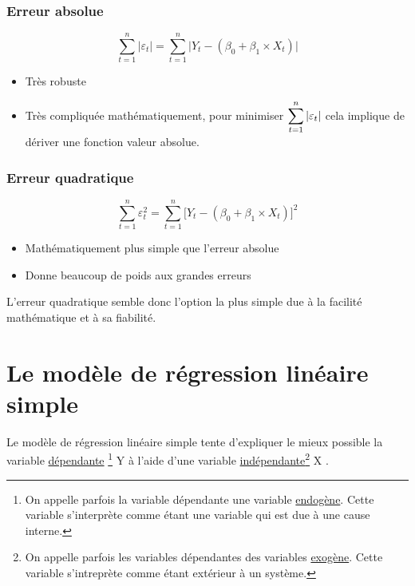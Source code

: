 \documentclass[11pt,french]{report}
\begin{document}
\subsubsection{Erreur absolue}
\begin{equation}
\displaystyle\sum_{t=1}^n |\varepsilon_t| = \displaystyle\sum_{t=1}^n \Big| Y_t - (\beta_0 + \beta_1\times X_t) \Big| 
\end{equation}

\bigskip
\begin{itemize}
\item Très robuste
\item Très compliquée mathématiquement, pour minimiser $\displaystyle\displaystyle\sum_{t=1}^n |\varepsilon_t|$ cela implique de dériver une fonction valeur absolue.
\end{itemize}

\subsubsection{Erreur quadratique}
\begin{equation}
\displaystyle\sum_{t=1}^n \varepsilon_t^2 = \displaystyle\sum_{t=1}^n \Big[ Y_t - (\beta_0 + \beta_1\times X_t) \Big]^2 
\end{equation}

\bigskip
\begin{itemize}
\item Mathématiquement plus simple que l'erreur absolue
\item Donne beaucoup de poids aux grandes erreurs
\end{itemize}

\bigskip
L'erreur quadratique semble donc l'option la plus simple due à la facilité mathématique et à sa fiabilité.

\section{Le modèle de régression linéaire simple}
Le modèle de régression linéaire simple tente d'expliquer le mieux possible la variable \href{https://fr.wikipedia.org/wiki/Variable_dépendante}{dépendante} \footnote{On appelle parfois la variable dépendante une variable \href{https://fr.wikipedia.org/wiki/Endogène}{endogène}. Cette variable s'interprète comme étant une variable qui est due à une cause interne.}  Y à l'aide d'une variable \href{https://fr.wikipedia.org/wiki/Variable_indépendante}{indépendante}\footnote{On appelle parfois les variables dépendantes des variables \href{https://fr.wikipedia.org/wiki/Exogène}{exogène}. Cette variable s'intreprète comme étant extérieur à un système.} X . 
\end{document}
